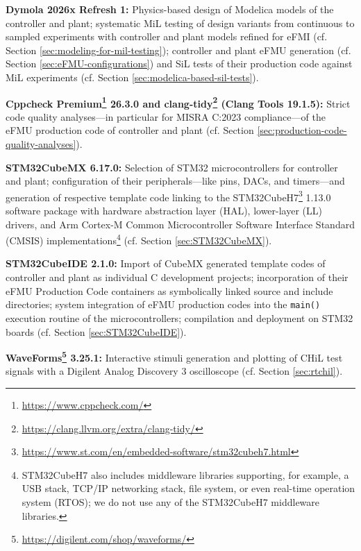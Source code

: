 \squishlist
    \item \textbf{Dymola\regtm{} 2026x Refresh 1:} Physics-based design of Modelica models of the controller and plant; systematic MiL testing of design variants from continuous to sampled experiments with controller and plant models refined for eFMI (cf. Section \ref{sec:modeling-for-mil-testing}); controller and plant eFMU generation (cf. Section \ref{sec:eFMU-configurations}) and SiL tests of their production code against MiL experiments (cf. Section \ref{sec:modelica-based-sil-tests}).
    \item \textbf{Cppcheck\regtm{} Premium\footnote{\label{fnt:cppcheck-premium}\tiny{\url{https://www.cppcheck.com/}}} 26.3.0 and clang-tidy\footnote{\label{fnt:clang-tidy}\tiny{\url{https://clang.llvm.org/extra/clang-tidy/}}} (Clang Tools 19.1.5):} Strict code quality analyses---in particular for MISRA C:2023 compliance---of the eFMU production code of controller and plant (cf. Section \ref{sec:production-code-quality-analyses}).
    \item \textbf{STM32CubeMX 6.17.0:} Selection of STM32 microcontrollers for controller and plant; configuration of their peripherals---like pins, DACs, and timers---and generation of respective template code linking to the STM32CubeH7\footnote{\tiny{\url{https://www.st.com/en/embedded-software/stm32cubeh7.html}}} 1.13.0 software package with hardware abstraction layer (HAL), lower-layer (LL) drivers, and Arm\regtm{} Cortex\regtm{}-M Common Microcontroller Software Interface Standard (CMSIS) implementations\footnote{STM32CubeH7 also includes middleware libraries supporting, for example, a USB stack, TCP/IP networking stack, file system, or even real-time operation system (RTOS); we do not use any of the STM32CubeH7 middleware libraries.} (cf. Section \ref{sec:STM32CubeMX}).
    \item \textbf{STM32CubeIDE 2.1.0:} Import of CubeMX generated template codes of controller and plant as individual C development projects; incorporation of their eFMU Production Code containers as symbolically linked source and include directories; system integration of eFMU production codes into the \texttt{main()} execution routine of the microcontrollers; compilation and deployment on STM32 boards (cf. Section \ref{sec:STM32CubeIDE}).
    \item \textbf{WaveForms\footnote{\label{fnt:waveforms}\tiny{\url{https://digilent.com/shop/waveforms/}}} 3.25.1:} Interactive stimuli generation and plotting of CHiL test signals with a Digilent\regtm{} Analog Discovery 3 oscilloscope (cf. Section \ref{sec:rtchil}).
\squishend

